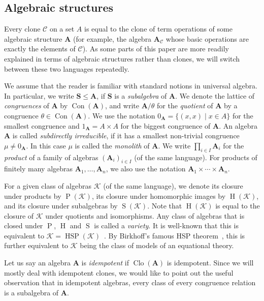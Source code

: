 \documentclass[12pt]{amsart}
\theoremstyle{definition}
\theoremstyle{definition}
\newcommand{\alg}[1]{\mathbf{#1}}
\newcommand{\algA}{\alg{A}}
\newcommand{\algS}{\alg{S}}
\DeclareMathOperator{\Con}{Con}
\DeclareMathOperator{\Clo}{Clo}
\DeclareMathOperator{\HSP}{HSP}
\DeclareMathOperator{\Ho}{H}
\DeclareMathOperator{\Su}{S}
\DeclareMathOperator{\Prd}{P}
\begin{document}
\subsection{Algebraic structures}

Every clone $\mathcal C$ on a set $A$ is equal to the
clone of term operations of some algebraic structure $\algA$ (for example, the algebra $\algA_\mathcal C$ whose
basic operations are exactly the elements of $\mathcal C$). As some parts of this paper are more readily explained in terms of algebraic structures rather than clones, we will switch between these two languages repeatedly. 

We assume that the reader is familiar with standard notions in universal algebra. In particular, we write $\alg{S} \leq \algA$, if $\algS$ is a \emph{subalgebra} of $\algA$. We denote the lattice  of \emph{congruences} of $\algA$ by $\Con(\algA)$, and write $\algA/\theta$ for the \emph{quotient} of $\algA$ by a congruence $\theta \in \Con(\algA)$. We use the notation $0_\algA = \{(x,x) \mid x \in A\}$ for the smallest congruence and $1_\algA = A\times A$ for the biggest congruence of $\algA$. An algebra $\algA$ is called \emph{subdirectly irreducible}, if it has a smallest non-trivial congruence $\mu \neq 0_\algA$. In this case $\mu$ is called the \emph{monolith} of $\algA$. We write $\prod_{i\in I}\algA_i$ for the \emph{product} of a family of algebras $(\algA_i)_{i\in I}$ (of the same language). For products of finitely many algebras $\algA_1, \ldots, \algA_n$, we also use the notation $\algA_1 \times \cdots \times \algA_n$.

For a given class of algebras $\mathcal K$ (of the same language), we denote its closure under products by $\Prd(\mathcal K)$, its closure under homomorphic images by $\Ho(\mathcal K)$, and its closure under subalgebras by $\Su(\mathcal K)$. Note that $\Ho(\mathcal K)$ is equal to the closure of $\mathcal K$ under quotients and isomorphisms. Any class of algebras that is closed under $\Prd$, $\Ho$ and $\Su$ is called a \emph{variety}. It is well-known that this is equivalent to $\mathcal K = \HSP(\mathcal K)$~\cite[Theorem 9.5]{BS}. By Birkhoff's famous HSP theorem~\cite{Bir-On-the-structure}, this is further equivalent to $\mathcal K$ being the class of models of an equational theory.

Let us say an algebra $\algA$ is \emph{idempotent} if $\Clo(\algA)$ is idempotent. Since we will mostly deal with idempotent clones, we would like to point out the useful observation that in idempotent algebras, every class of every congruence relation is a subalgebra of $\algA$.
\end{document}

